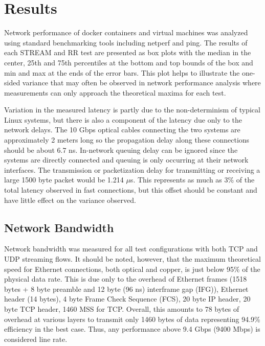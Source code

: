 \chapter{Results}
\label{cha:results}
\label{sec:results}
Network performance of docker containers and virtual machines was analyzed using standard benchmarking tools including netperf and ping.  
The results of each STREAM and RR test are presented as box plots with the median in the center, 25th and 75th percentiles at the bottom and top bounds of the box and min and max at the ends of the error bars.
This plot helps to illustrate the one-sided variance that may often be observed in network performance analysis where measurements can only approach the theoretical maxima for each test.  

Variation in the measured latency is partly due to the non-determinism of typical Linux systems, but there is also a component of the latency due only to the network delays.
The 10 Gbps optical cables connecting the two systems are approximately 2 meters long so the propagation delay along these connections should be about 6.7 ns.
In-network queuing delay can be ignored since the systems are directly connected and queuing is only occurring at their network interfaces.
The transmission or packetization delay for transmitting or receiving a large 1500 byte packet would be 1.214 $\mu$s.
This represents as much as 3\% of the total latency observed in fast connections, but this offset should be constant and have little effect on the variance observed. 

\section{Network Bandwidth} %
\label{sec:networkbandwidth}
Network bandwidth was measured for all test configurations with both TCP and UDP streaming flows.
It should be noted, however, that the maximum theoretical speed for Ethernet connections, both optical and copper, is just below 95\% of the physical data rate.
This is due only to the overhead of Ethernet frames (1518 bytes + 8 byte preamble and 12 byte (96 ns) interframe gap (IFG)), Ethernet header (14 bytes), 4 byte Frame Check Sequence (FCS), 20 byte IP header, 20 byte TCP header, 1460 MSS for TCP.
Overall, this amounts to 78 bytes of overhead at various layers to transmit only 1460 bytes of data representing 94.9\% efficiency in the best case.  
Thus, any performance above 9.4 Gbps (9400 Mbps) is considered line rate.  

